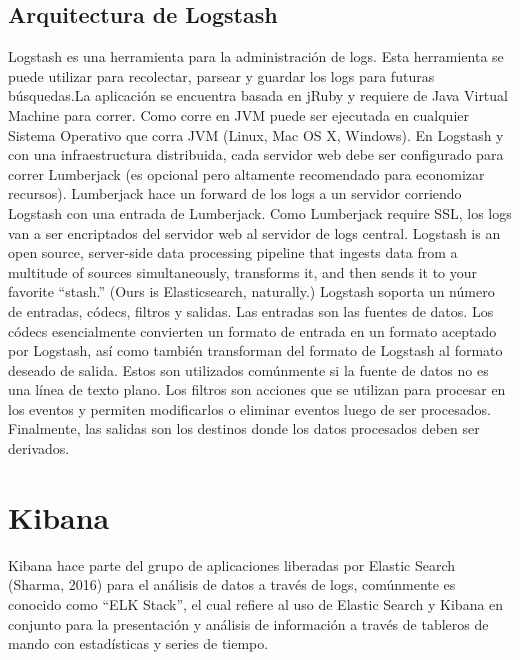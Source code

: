 \subsection{Arquitectura de Logstash}\label{arquitectura-logtash}
Logstash es una herramienta para la administración de logs. Esta herramienta se puede utilizar para recolectar, parsear y guardar los logs para futuras búsquedas.La aplicación se encuentra basada en jRuby y requiere de Java Virtual Machine para correr. Como corre en JVM puede ser ejecutada en cualquier Sistema Operativo que corra JVM (Linux, Mac OS X, Windows).
En Logstash y con una infraestructura distribuida, cada servidor web debe ser configurado para correr Lumberjack (es opcional pero altamente recomendado para economizar recursos). Lumberjack hace un forward de los logs a un servidor corriendo Logstash con una entrada de Lumberjack. Como Lumberjack require SSL, los logs van a ser encriptados del servidor web al servidor de logs central.
Logstash is an open source, server-side data processing pipeline that ingests data from a multitude of sources simultaneously, transforms it, and then sends it to your favorite “stash.” (Ours is Elasticsearch, naturally.)	
Logstash soporta un número de entradas, códecs, filtros y salidas. Las entradas son las fuentes de datos. Los códecs esencialmente convierten un formato de entrada en un formato aceptado por Logstash, así como también transforman del formato de Logstash al formato deseado de salida. Estos son utilizados comúnmente si la fuente de datos no es una línea de texto plano. Los filtros son acciones que se utilizan para procesar en los eventos y permiten modificarlos o eliminar eventos luego de ser procesados. Finalmente, las salidas son los destinos donde los datos procesados deben ser derivados.
\section{Kibana}\label{kibana}
Kibana hace parte del grupo de aplicaciones liberadas por Elastic Search (Sharma, 2016)  para el análisis de datos a través de logs, comúnmente es conocido como “ELK Stack”, el cual refiere al uso de Elastic Search y Kibana en conjunto para la presentación y análisis de información a través de tableros de mando con estadísticas y series de tiempo.
